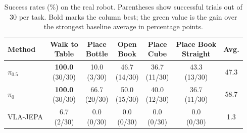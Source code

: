 \documentclass{article}
\begin{document}
\begin{table}[!tbh]
\centering\small
\setlength{\tabcolsep}{3pt}
\renewcommand{\arraystretch}{1.13}
\caption{Success rates (\%) on the real robot. Parentheses show successful trials out of 30 per task. Bold marks the column best; the green value is the gain over the strongest baseline average in percentage points.}
\label{tab:main_results}
\begin{tabular}{lccccc c}
\toprule
\textbf{Method} & \shortstack{\textbf{Walk to}\\\textbf{Table}} & \shortstack{\textbf{Place}\\\textbf{Bottle}} & \shortstack{\textbf{Open}\\\textbf{Book}} & \shortstack{\textbf{Place}\\\textbf{Cube}} & \shortstack{\textbf{Place Book}\\\textbf{Straight}} & \textbf{Avg.} \\
\midrule
\shortstack[l]{$\pi_{0.5}$\\{\scriptsize\citep{black2025pi05}}} & \shortstack{\textbf{100.0}\\{\scriptsize(30/30)}} & \shortstack{10.0\\{\scriptsize(3/30)}} & \shortstack{46.7\\{\scriptsize(14/30)}} & \shortstack{36.7\\{\scriptsize(11/30)}} & \shortstack{43.3\\{\scriptsize(13/30)}} & 47.3 \\
\shortstack[l]{$\pi_0$\\{\scriptsize\citep{black2024pi0}}} & \shortstack{\textbf{100.0}\\{\scriptsize(30/30)}} & \shortstack{66.7\\{\scriptsize(20/30)}} & \shortstack{50.0\\{\scriptsize(15/30)}} & \shortstack{40.0\\{\scriptsize(12/30)}} & \shortstack{36.7\\{\scriptsize(11/30)}} & 58.7 \\
\shortstack[l]{VLA-JEPA\\{\scriptsize\citep{sun2026vlajepa}}} & \shortstack{6.7\\{\scriptsize(2/30)}} & \shortstack{0.0\\{\scriptsize(0/30)}} & \shortstack{0.0\\{\scriptsize(0/30)}} & \shortstack{0.0\\{\scriptsize(0/30)}} & \shortstack{0.0\\{\scriptsize(0/30)}} & 1.3 \\

\end{tabular}
\end{table}
\end{document}

